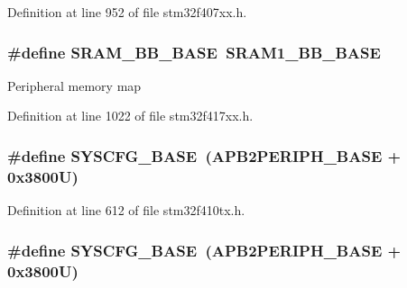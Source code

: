 Definition at line 952 of file stm32f407xx.\+h.

\subsubsection[{\texorpdfstring{S\+R\+A\+M\+\_\+\+B\+B\+\_\+\+B\+A\+SE}{SRAM_BB_BASE}}]{\setlength{\rightskip}{0pt plus 5cm}\#define S\+R\+A\+M\+\_\+\+B\+B\+\_\+\+B\+A\+SE~{\bf S\+R\+A\+M1\+\_\+\+B\+B\+\_\+\+B\+A\+SE}}\hypertarget{group___peripheral__registers__structures_gad3548b6e2f017f39d399358f3ac98454}{}\label{group___peripheral__registers__structures_gad3548b6e2f017f39d399358f3ac98454}
Peripheral memory map 

Definition at line 1022 of file stm32f417xx.\+h.

\subsubsection[{\texorpdfstring{S\+Y\+S\+C\+F\+G\+\_\+\+B\+A\+SE}{SYSCFG_BASE}}]{\setlength{\rightskip}{0pt plus 5cm}\#define S\+Y\+S\+C\+F\+G\+\_\+\+B\+A\+SE~({\bf A\+P\+B2\+P\+E\+R\+I\+P\+H\+\_\+\+B\+A\+SE} + 0x3800\+U)}\hypertarget{group___peripheral__registers__structures_ga62246020bf3b34b6a4d8d0e84ec79d3d}{}\label{group___peripheral__registers__structures_ga62246020bf3b34b6a4d8d0e84ec79d3d}


Definition at line 612 of file stm32f410tx.\+h.

\subsubsection[{\texorpdfstring{S\+Y\+S\+C\+F\+G\+\_\+\+B\+A\+SE}{SYSCFG_BASE}}]{\setlength{\rightskip}{0pt plus 5cm}\#define S\+Y\+S\+C\+F\+G\+\_\+\+B\+A\+SE~({\bf A\+P\+B2\+P\+E\+R\+I\+P\+H\+\_\+\+B\+A\+SE} + 0x3800\+U)}\hypertarget{group___peripheral__registers__structures_ga62246020bf3b34b6a4d8d0e84ec79d3d}{}\label{group___peripheral__registers__structures_ga62246020bf3b34b6a4d8d0e84ec79d3d}


